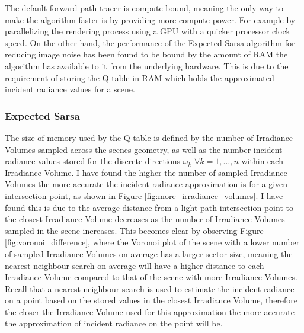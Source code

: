 \documentclass[../dissertation.tex]{subfiles}
\begin{document}
The default forward path tracer is compute bound, meaning the only way to make the algorithm faster is by providing more compute power. For example by parallelizing the rendering process using a GPU with a quicker processor clock speed. On the other hand, the performance of the Expected Sarsa algorithm for reducing image noise has been found to be bound by the amount of RAM the algorithm has available to it from the  underlying hardware. This is due to the requirement of storing the Q-table in RAM which holds the approximated incident radiance values for a scene.\\

\subsubsection{Expected Sarsa}

The size of memory used by the Q-table is defined by the number of Irradiance Volumes sampled across the scenes geometry, as well as the number incident radiance values stored for the discrete directions $\omega_k$ $\forall k = 1,...,n$  within each Irradiance Volume. I have found the higher the number of sampled Irradiance Volumes the more accurate the incident radiance approximation is for a given intersection point, as shown in Figure \ref{fig:more_irradiance_volumes}.  I have found this is due to the average distance from a light path intersection point to the closest Irradiance Volume decreases as the number of Irradiance Volumes sampled in the scene increases. This becomes clear by observing Figure \ref{fig:voronoi_difference}, where the Voronoi plot of the scene with a lower number of sampled Irradiance Volumes on average has a larger sector size, meaning the nearest neighbour search on average will have a higher distance to each Irradiance Volume compared to that of the scene with more Irradiance Volumes. Recall that a nearest neighbour search is used to estimate the incident radiance on a point based on the stored values in the closest Irradiance Volume, therefore the closer the Irradiance Volume used for this approximation the more accurate the approximation of incident radiance on the point will be.\\

\end{document}
